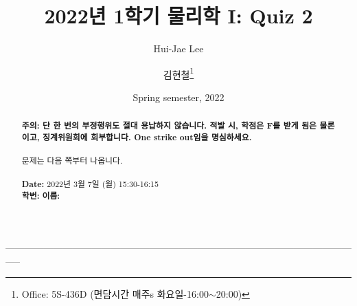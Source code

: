 \documentclass[APS,floatfix,nofootinbib,superscriptaddress,fleqn,preprint]{revtex4}
\begin{document}
\title{\Large 2022년 1학기 물리학 I: Quiz 2}
\author{Hui-Jae Lee} 
\author{김현철\footnote{Office: 5S-436D (면담시간 매주s
    화요일-16:00$\sim$20:00)}} 
\date{Spring semester, 2022}


\vspace{1.cm}
\begin{abstract}
\noindent \textbf{ {\color{red}주의}: \color{blue} 단 한 번의 부정행위도 절대
  용납하지 않습니다. 적발 시, 학점은 F를 받게 됨은 물론이고,
  징계위원회에 회부합니다. One strike out임을 명심하세요.}\\
\\
문제는 다음 쪽부터 나옵니다.  \\ \\
{\bf Date:} 2022년 3월 7일 (월) 15:30-16:15 
\\
{\bf 학번:} \hspace{4cm}
{\bf 이름:} 

\end{abstract}
\maketitle
-----------------------------------------------------------------------------------------------------------------
\end{document}
